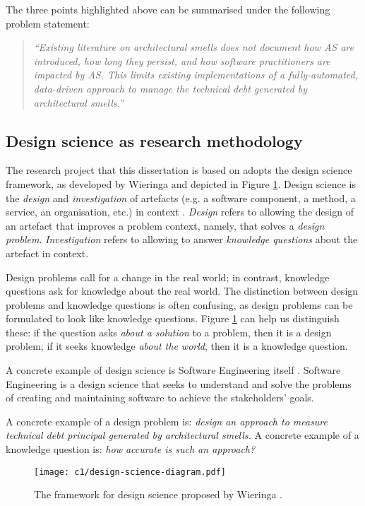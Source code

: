 The three points highlighted above can be summarised under the following problem statement:
\begin{quote}\itshape
    ``Existing literature on architectural smells does not document how AS are introduced, how long they persist, and how software practitioners are impacted by AS. 
    This limits existing implementations of a fully-automated, data-driven approach to manage the technical debt generated by architectural smells.''
\end{quote}

\subsection{Design science as research methodology}
The research project that this dissertation is based on adopts the design science framework, as developed by Wieringa \cite{Wieringa2014} and depicted in Figure \ref{fig:design-science}.
Design science is the \emph{design} and \emph{investigation} of artefacts (e.g. a software component, a method, a service, an organisation, etc.) in context \cite{Wieringa2014}.
\emph{Design} refers to allowing the design of an artefact that improves a problem context, namely, that solves a \emph{design problem}. 
\emph{Investigation} refers to allowing to answer \emph{knowledge questions} about the artefact in context.

Design problems call for a change in the real world; in contrast, knowledge questions ask for knowledge about the real world.
The distinction between design problems and knowledge questions is often confusing, as design problems can be formulated to look like knowledge questions.
Figure \ref{fig:design-science} can help us distinguish these: if the question asks  \emph{about a solution} to a problem, then it is a design problem; if it seeks knowledge \emph{about the world}, then it is a knowledge question.

A concrete example of design science is Software Engineering itself \cite{Wieringa2014}.
Software Engineering is a design science that seeks to understand and solve the problems of creating and maintaining software to achieve the stakeholders' goals.

A concrete example of a design problem is: \emph{design an approach to measure technical debt principal generated by architectural smells.}
A concrete example of a knowledge question is: \emph{how accurate is such an approach?}

\begin{figure}
    \centering
    \texttt{[image: c1/design-science-diagram.pdf]}
    \caption{The framework for design science proposed by Wieringa \cite{Wieringa2014}.}\label{fig:design-science}
\end{figure}

